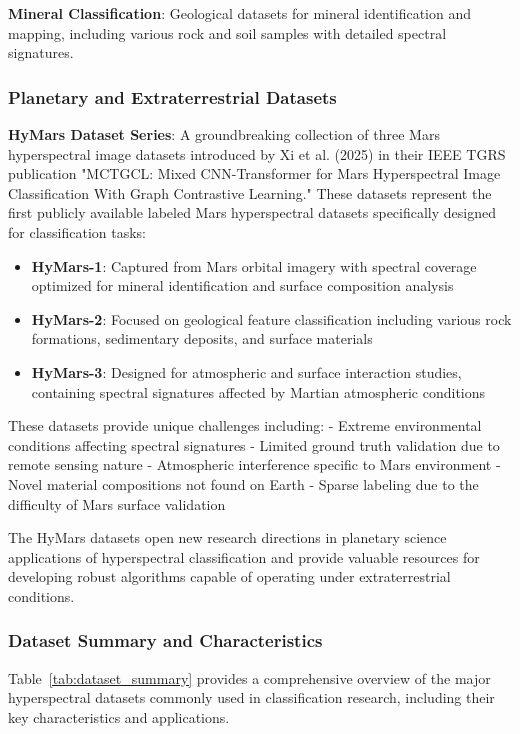 \documentclass[journal]{IEEEtran}
\begin{document}
\textbf{Mineral Classification}: Geological datasets for mineral identification and mapping, including various rock and soil samples with detailed spectral signatures.

\subsubsection{Planetary and Extraterrestrial Datasets}

\textbf{HyMars Dataset Series}: A groundbreaking collection of three Mars hyperspectral image datasets introduced by Xi et al. (2025) in their IEEE TGRS publication "MCTGCL: Mixed CNN-Transformer for Mars Hyperspectral Image Classification With Graph Contrastive Learning." These datasets represent the first publicly available labeled Mars hyperspectral datasets specifically designed for classification tasks:

\begin{itemize}
\item \textbf{HyMars-1}: Captured from Mars orbital imagery with spectral coverage optimized for mineral identification and surface composition analysis
\item \textbf{HyMars-2}: Focused on geological feature classification including various rock formations, sedimentary deposits, and surface materials
\item \textbf{HyMars-3}: Designed for atmospheric and surface interaction studies, containing spectral signatures affected by Martian atmospheric conditions
\end{itemize}

These datasets provide unique challenges including:
- Extreme environmental conditions affecting spectral signatures
- Limited ground truth validation due to remote sensing nature
- Atmospheric interference specific to Mars environment
- Novel material compositions not found on Earth
- Sparse labeling due to the difficulty of Mars surface validation

The HyMars datasets open new research directions in planetary science applications of hyperspectral classification and provide valuable resources for developing robust algorithms capable of operating under extraterrestrial conditions.

\subsubsection{Dataset Summary and Characteristics}

Table~\ref{tab:dataset_summary} provides a comprehensive overview of the major hyperspectral datasets commonly used in classification research, including their key characteristics and applications.
\end{document}
